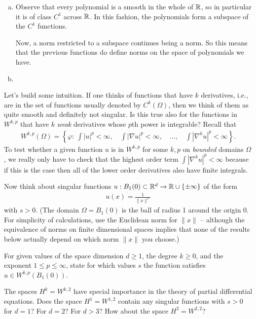 \documentclass[12pt]{memoir}
\begin{document}
\begin{ptcbr}
\begin{enumerate}[(a)]
    \item Observe that every polynomial is a smooth in the whole of $\mathbb{R}$, so in particular it is of class $C^1$ across $\mathbb{R}$. In this fashion, the polynomials form a subspace of the $C^1$ functions.\par 
    Now, a norm restricted to a subspace continues being a norm. So this means that the previous functions do define norms on the space of polynomials we have.
    \item 
\end{enumerate}
\end{ptcbr}
\begin{Ej}
    
Let's build some intuition. If one thinks of functions that have $k$
derivatives, i.e., are in the set of functions usually denoted by
$C^k(\Omega)$, then we think of them as quite smooth and definitely
not singular. Is this true also for the functions in $W^{k,p}$ that
have $k$ \textit{weak} derivatives whose $p$th power is integrable?
Recall that
\begin{align*}
  W^{k,p}(\Omega) = \left\{ \varphi: \ \int |u|^p < \infty,
  \quad
  \int |\nabla u|^p < \infty,
  \quad
  \ldots,
  \quad
  \int |\nabla^k u|^p < \infty
  \right\}.
\end{align*}
To test whether a given function $u$ is in $W^{k,p}$ for some $k,p$ on
\textit{bounded} domains $\Omega$,
we really only have to check that the highest order term $\int |\nabla^k u|^p < \infty$
because if this is the case then all of the lower order derivatives
also have finite integrals.

Now think about singular functions $u : B_1(0)\subset \mathbb{R}^d \rightarrow \mathbb{R}\cup\{\pm\infty\}$
of the form
\begin{align*}
  u(x) = \frac{1}{\|x\|^s}
\end{align*}
with $s>0$. (The domain $\Omega=B_1(0)$ is the ball of radius 1
around the origin 0. For simplicity of calculations, use the Euclidean norm
for $\|x\|$ -- although the equivalence of norms on finite dimensional
spaces implies that none of the results below actually depend on which
norm $\|x\|$ you choose.)

For given values of the space dimension $d\ge 1$, the degree $k\ge 0$,
and the exponent $1\le p\le \infty$, state for which values $s$ the
function satisfies $u \in W^{k,p}(B_1(0))$.

The spaces $H^k=W^{k,2}$ have special importance in the theory of
partial differential equations.
Does the space $H^1 = W^{1,2}$ contain any singular functions with $s>0$ for
$d=1$? For $d=2$? For $d>3$? How about the space $H^2=W^{2,2}$?
\end{Ej}
\end{document}
